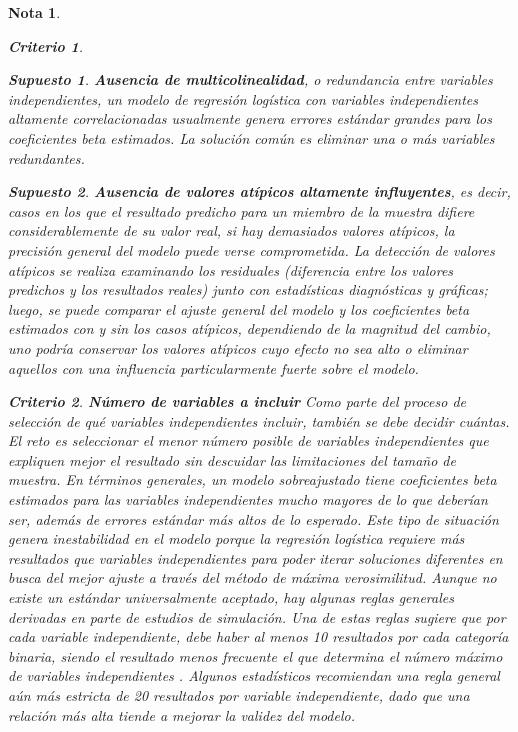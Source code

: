 \documentclass[12pt]{article}
\newtheorem{Criterio}{Criterio}%
\newtheorem{Sup}{Supuesto}%
\newtheorem{Note}{Nota}%
\begin{document}
\begin{Note}
\begin{Criterio}
\begin{Sup} \textbf{Ausencia de multicolinealidad}, o redundancia entre variables independientes,  un modelo de regresi\'on log\'istica con variables independientes altamente correlacionadas usualmente genera errores est\'andar grandes para los coeficientes beta estimados. La soluci\'on com\'un es eliminar una o m\'as variables redundantes.
\end{Sup}

\begin{Sup} \textbf{Ausencia de valores at\'ipicos altamente influyentes}, es decir, casos en los que el resultado predicho para un miembro de la muestra difiere considerablemente de su valor real, si hay demasiados valores at\'ipicos, la precisi\'on general del modelo puede verse comprometida. La detecci\'on de valores at\'ipicos se realiza examinando los residuales (diferencia entre los valores predichos y los resultados reales) junto con estad\'isticas diagn\'osticas y gr\'aficas; luego, se puede comparar el ajuste general del modelo y los coeficientes beta estimados con y sin los casos at\'ipicos, dependiendo de la magnitud del cambio, uno podr\'ia conservar los valores at\'ipicos cuyo efecto no sea alto o eliminar aquellos con una influencia particularmente fuerte sobre el modelo.
\end{Sup}
\end{Criterio}

\begin{Criterio} \textbf{N\'umero de variables a incluir} Como parte del proceso de selecci\'on de qu\'e variables independientes incluir, tambi\'en se debe decidir cu\'antas. El reto es seleccionar el menor n\'umero posible de variables independientes que expliquen mejor el resultado sin descuidar las limitaciones del tama\~no de muestra. En t\'erminos generales, un modelo sobreajustado tiene coeficientes beta estimados para las variables independientes mucho mayores de lo que deber\'ian ser, adem\'as de errores est\'andar m\'as altos de lo esperado. Este tipo de situaci\'on genera inestabilidad en el modelo porque la regresi\'on log\'istica requiere m\'as resultados que variables independientes para poder iterar soluciones diferentes en busca del mejor ajuste a trav\'es del m\'etodo de m\'axima verosimilitud. Aunque no existe un est\'andar universalmente aceptado, hay algunas \textit{reglas generales} derivadas en parte de estudios de simulaci\'on. Una de estas reglas sugiere que por cada variable independiente, debe haber al menos 10 resultados por cada categor\'ia binaria, siendo el resultado menos frecuente el que determina el n\'umero m\'aximo de variables independientes \cite{peduzzi1996, agresti2007}. Algunos estad\'isticos recomiendan una \textit{regla general} a\'un m\'as estricta de 20 resultados por variable independiente, dado que una relaci\'on m\'as alta tiende a mejorar la validez del modelo\cite{feinstein1996}. 
\end{Criterio}
\end{Note}
\end{document}
